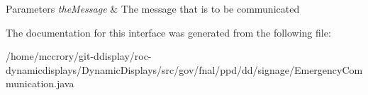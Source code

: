 \begin{DoxyParams}{Parameters}
{\em the\-Message} & The message that is to be communicated \\
\hline
\end{DoxyParams}


The documentation for this interface was generated from the following file\-:\begin{DoxyCompactItemize}
\item 
/home/mccrory/git-\/ddisplay/roc-\/dynamicdisplays/\-Dynamic\-Displays/src/gov/fnal/ppd/dd/signage/Emergency\-Communication.\-java\end{DoxyCompactItemize}

